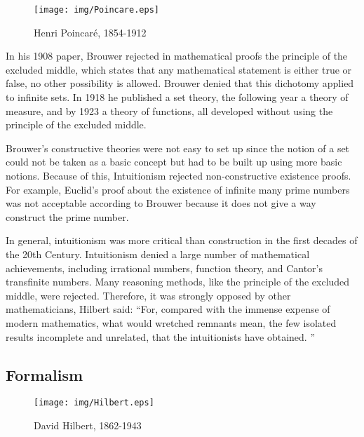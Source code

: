 \documentclass{article}
\begin{document}
\begin{wrapfigure}{R}{0.3\textwidth}
 \centering
 \texttt{[image: img/Poincare.eps]}
 \captionsetup{labelformat=empty}
 \caption{Henri Poincaré, 1854-1912}
 \label{fig:Poincare}
\end{wrapfigure}

In his 1908 paper, Brouwer rejected in mathematical proofs the principle of the excluded middle, which states that any mathematical statement is either true or false, no other possibility is allowed. Brouwer denied that this dichotomy applied to infinite sets. In 1918 he published a set theory, the following year a theory of measure, and by 1923 a theory of functions, all developed without using the principle of the excluded middle.

Brouwer's constructive theories were not easy to set up since the notion of a set could not be taken as a basic concept but had to be built up using more basic notions. Because of this, Intuitionism rejected non-constructive existence proofs. For example, Euclid's proof about the existence of infinite many prime numbers was not acceptable according to Brouwer because it does not give a way construct the prime number.

In general, intuitionism was more critical than construction in the first decades of the 20th Century. Intuitionism denied a large number of mathematical achievements, including irrational numbers, function theory, and Cantor's transfinite numbers. Many reasoning methods, like the principle of the excluded middle, were rejected. Therefore, it was strongly opposed by other mathematicians, Hilbert said: ``For, compared with the immense expense of modern mathematics, what would wretched remnants mean, the few isolated results incomplete and unrelated, that the intuitionists have obtained. ''


\subsection{Formalism}

\begin{wrapfigure}{L}{0.5\textwidth}
 \centering
 \texttt{[image: img/Hilbert.eps]}
 \captionsetup{labelformat=empty}
 \caption{David Hilbert, 1862-1943}
 \label{fig:Hilbert}
\end{wrapfigure}
\end{document}
